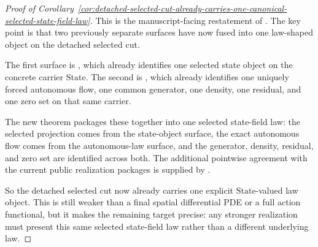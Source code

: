 \begin{proof}[Proof of Corollary~\ref{cor:detached-selected-cut-already-carries-one-canonical-selected-state-field-law}]
\label{proof:cor:detached-selected-cut-already-carries-one-canonical-selected-state-field-law}
This is the manuscript-facing restatement of
. The
key point is that two previously separate surfaces have now fused into one
law-shaped object on the detached selected cut.

The first surface is
, which
already identifies one selected state object on the concrete carrier
\(\mathrm{State}\). The second is
,
which already identifies one uniquely forced autonomous flow, one common
generator, one density, one residual, and one zero set on that same carrier.

The new theorem packages these together into one selected state-field law:
the selected projection comes from the state-object surface, the exact
autonomous flow comes from the autonomous-law surface, and the generator,
density, residual, and zero set are identified across both. The additional
pointwise agreement with the current public realization packages is supplied by
.

So the detached selected cut now already carries one explicit
\(\mathrm{State}\)-valued law object. This is still weaker than a final
spatial differential PDE or a full action functional, but it makes the
remaining target precise: any stronger realization must present this same
selected state-field law rather than a different underlying law.
\end{proof}

